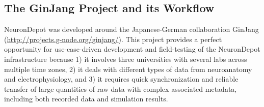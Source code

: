 \documentclass{frontiersSCNS} %
\begin{document}
\subsection{The GinJang Project and its Workflow}
\label{sec:ginjang}
NeuronDepot was developed around the Japanese-German collaboration GinJang
(\url{http://projects.g-node.org/ginjang/}).
This project provides a perfect opportunity for use-case-driven development and
field-testing of the NeuronDepot infrastructure because 1) it involves three
universities with several labs across multiple time zones, 2) it deals with
different types of data from neuroanatomy and electrophysiology, and 3) it
requires quick synchronization and reliable transfer of large quantities of raw
data with complex associated metadata, including both recorded data and
simulation results.
\end{document}
